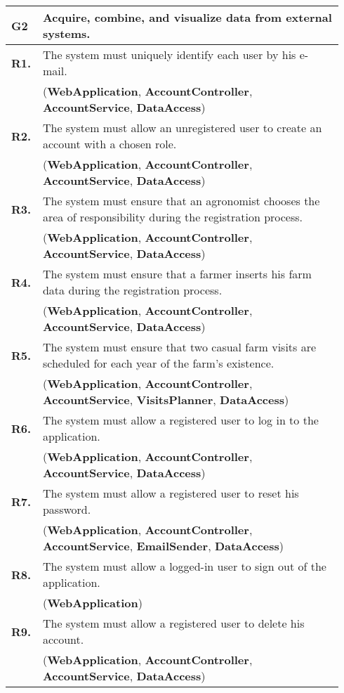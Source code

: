\begin{longtable}{p{0.06\linewidth} p{0.88\linewidth}} 
    \toprule
    \textbf{G2} & Acquire, combine, and visualize data from external systems. \\ 
    \midrule
	\textbf{R1.} & The system must uniquely identify each user by his e-mail. \\
	& (\textbf{WebApplication}, \textbf{AccountController}, \textbf{AccountService}, \textbf{DataAccess})\\
	\textbf{R2.} & The system must allow an unregistered user to create an account with a chosen role. \\
	& (\textbf{WebApplication}, \textbf{AccountController}, \textbf{AccountService}, \textbf{DataAccess})\\
	\textbf{R3.} & The system must ensure that an agronomist chooses the area of responsibility during the registration process. \\
	& (\textbf{WebApplication}, \textbf{AccountController}, \textbf{AccountService}, \textbf{DataAccess})\\
	\textbf{R4.} & The system must ensure that a farmer inserts his farm data during the registration process.\\
	& (\textbf{WebApplication}, \textbf{AccountController}, \textbf{AccountService}, \textbf{DataAccess})\\
	\textbf{R5.} & The system must ensure that two casual farm visits are scheduled for each year of the farm's existence.\\
	& (\textbf{WebApplication}, \textbf{AccountController}, \textbf{AccountService}, \textbf{VisitsPlanner}, \textbf{DataAccess})\\
	\textbf{R6.} & The system must allow a registered user to log in to the application. \\
	& (\textbf{WebApplication}, \textbf{AccountController}, \textbf{AccountService}, \textbf{DataAccess})\\
	\textbf{R7.} & The system must allow a registered user to reset his password. \\
	& (\textbf{WebApplication}, \textbf{AccountController}, \textbf{AccountService}, \textbf{EmailSender}, \textbf{DataAccess})\\
	\textbf{R8.} & The system must allow a logged-in user to sign out of the application. \\
	& (\textbf{WebApplication})\\
	\textbf{R9.} & The system must allow a registered user to delete his account. \\
	& (\textbf{WebApplication}, \textbf{AccountController}, \textbf{AccountService}, \textbf{DataAccess})\\
	

\end{longtable}
